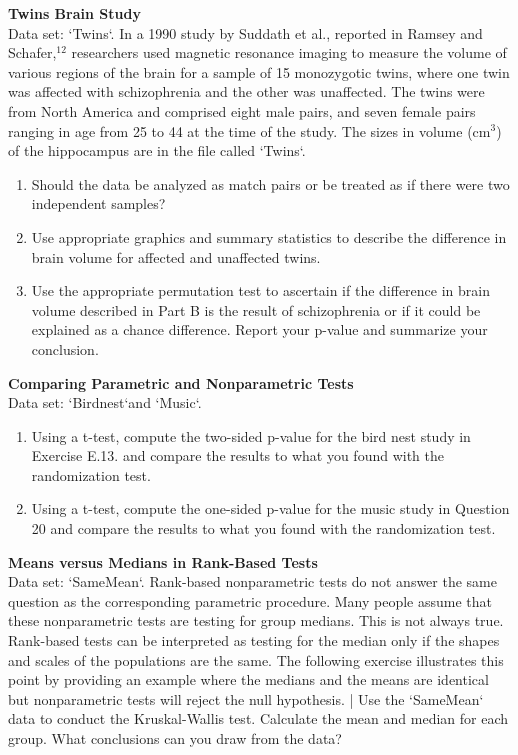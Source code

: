 \documentclass[
]{report}
\begin{document}
\begin{list}{E.}{ \setlength{\itemsep}{0.5em}}
  
  \item \textbf{Twins Brain Study} \\
  Data set: `Twins`. In a 1990 study by Suddath et al., reported in Ramsey and Schafer,$^{12}$ researchers used magnetic
resonance imaging to measure the volume of various regions of the brain for a sample of 15 monozygotic
twins, where one twin was affected with schizophrenia and the other was unaffected. The
twins were from North America and comprised eight male pairs, and seven female pairs ranging
in age from 25 to 44 at the time of the study. The sizes in volume (cm$^3$) of the hippocampus are in
the file called `Twins`.
  \begin{enumerate}
    \setcounter{enumi}{0}  
    \item Should the data be analyzed as match pairs or be treated as if there were two independent
samples?
    \item Use appropriate graphics and summary statistics to describe the difference in brain volume for
affected and unaffected twins.
    \item Use the appropriate permutation test to ascertain if the difference in brain volume described in
Part B is the result of schizophrenia or if it could be explained as a chance difference. Report
your p-value and summarize your conclusion.
  \end{enumerate}
  
  
  \item \textbf{Comparing Parametric and Nonparametric Tests} \\
  Data set: `Birdnest`and `Music`.
  \begin{enumerate}
    \setcounter{enumi}{0}  
    \item Using a t-test, compute the two-sided p-value for the bird nest study in Exercise E.13. and compare
the results to what you found with the randomization test.
    \item Using a t-test, compute the one-sided p-value for the music study in Question 20 and compare the
results to what you found with the randomization test.
  \end{enumerate}
  
  
  
  
  \item \textbf{Means versus Medians in Rank-Based Tests} \\
  Data set: `SameMean`. Rank-based nonparametric tests do not answer the same question as the corresponding parametric
procedure. Many people assume that these nonparametric tests are testing for group medians. This is
not always true. Rank-based tests can be interpreted as testing for the median only if the shapes and
scales of the populations are the same. The following exercise illustrates this point by providing an
example where the medians and the means are identical but nonparametric tests will reject the null
hypothesis.
| Use the `SameMean` data to conduct the Kruskal-Wallis test. Calculate the mean and median for
each group. What conclusions can you draw from the data?
  

\end{list}
\end{document}
